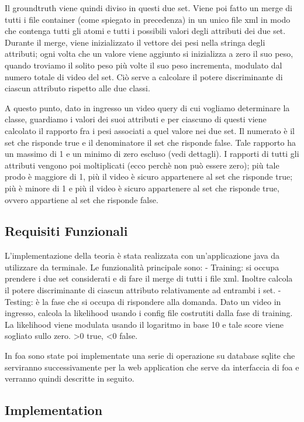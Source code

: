 Il groundtruth viene quindi diviso in questi due set. Viene poi fatto un merge di tutti i file container (come spiegato in precedenza) in un unico file xml in modo che contenga tutti gli atomi e tutti i possibili valori degli attributi dei due set. Durante il merge, viene inizializzato il vettore dei pesi nella stringa degli attributi; ogni volta che un valore viene aggiunto si inizializza a zero il suo peso, quando troviamo il solito peso più volte il suo peso incrementa, modulato dal numero totale di video del set. Ciò serve a calcolare il potere discriminante di ciascun attributo rispetto alle due classi.

A questo punto, dato in ingresso un video query di cui vogliamo determinare la classe, guardiamo i valori dei suoi attributi e per ciascuno di questi viene calcolato il rapporto fra i pesi associati a quel valore nei due set. Il numerato è il set che risponde true e il denominatore il set che risponde false. Tale rapporto ha un massimo di 1 e un minimo di zero escluso (vedi dettagli). I rapporti di tutti gli attributi vengono poi moltiplicati (ecco perchè non può essere zero); più tale prodo è maggiore di 1, più il video è sicuro appartenere al set che risponde true; più è minore di 1 e più il video è sicuro appartenere al set che risponde true, ovvero appartiene al set che risponde false.


\subsection{Requisiti Funzionali}

L'implementazione della teoria è stata realizzata con un'applicazione java da utilizzare da terminale. Le funzionalità principale sono:
- Training: si occupa prendere i due set considerati e di fare il merge di tutti i file xml. Inoltre calcola il potere discriminante di ciascun attributo relativamente ad entrambi i set.
- Testing: è la fase che si occupa di rispondere alla domanda. Dato un video in ingresso, calcola la likelihood usando i config file costrutiti dalla fase di training. La likelihood viene modulata usando il logaritmo in base 10 e tale score viene sogliato sullo zero. >0 true, <0 false.

In foa sono state poi implementate una serie di operazione su database sqlite che serviranno successivamente per la web application che serve da interfaccia di foa e verranno quindi descritte in seguito.

\subsection{Implementation}

